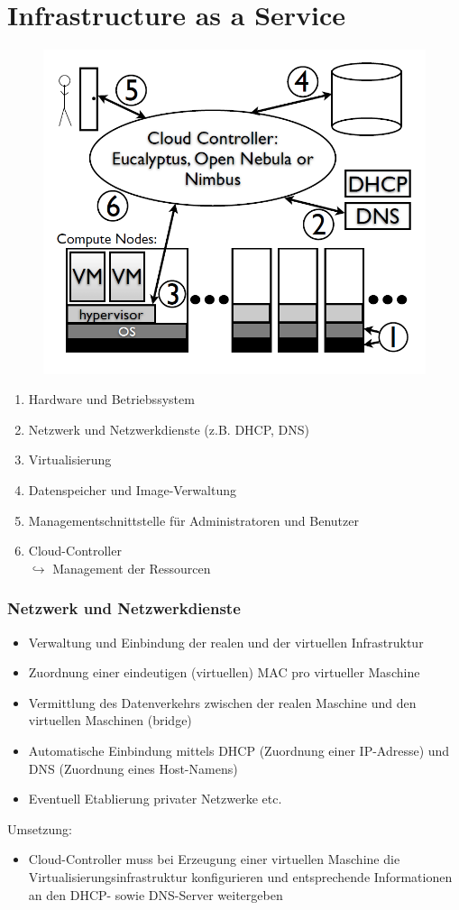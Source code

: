 \documentclass[a4paper,10pt]{scrreprt}
\begin{document}
	\section{Infrastructure as a Service}
	\begin{figure}[ht]
		\centering
		\includegraphics[width=.7\textwidth]{images/iaas}
	\end{figure}
	\begin{enumerate}
		\item Hardware und Betriebssystem
		\item Netzwerk und Netzwerkdienste (z.B. DHCP, DNS)
		\item Virtualisierung
		\item Datenspeicher und Image-Verwaltung
		\item Managementschnittstelle für Administratoren und Benutzer
		\item Cloud-Controller\\[5pt]
		$\hookrightarrow$ Management der Ressourcen
	\end{enumerate}
	\subsubsection{Netzwerk und Netzwerkdienste}
	\begin{itemize}
		\item Verwaltung und Einbindung der realen und der virtuellen Infrastruktur
		\item Zuordnung einer eindeutigen (virtuellen) MAC pro virtueller Maschine
		\item Vermittlung des Datenverkehrs zwischen der realen Maschine und den virtuellen Maschinen (bridge)
		\item Automatische Einbindung mittels DHCP (Zuordnung einer IP-Adresse) und DNS (Zuordnung eines Host-Namens)
		\item Eventuell Etablierung privater Netzwerke etc.
	\end{itemize}
	Umsetzung:
	\begin{itemize}
		\item Cloud-Controller muss bei Erzeugung einer virtuellen Maschine die Virtualisierungsinfrastruktur konfigurieren und entsprechende Informationen an den DHCP- sowie DNS-Server weitergeben
	\end{itemize}
\end{document}
